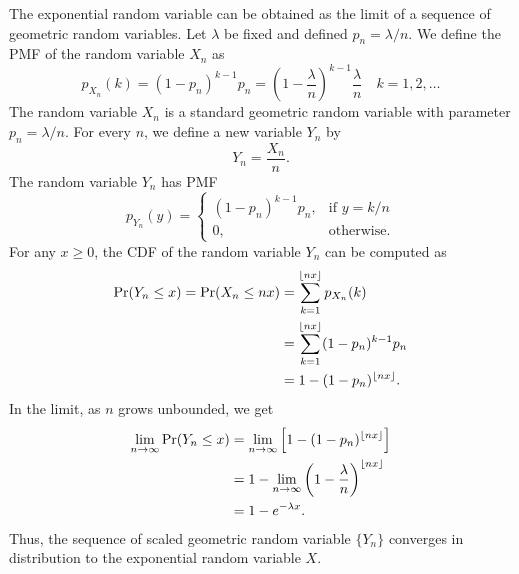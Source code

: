 The exponential random variable can be obtained as the limit of a sequence of geometric random variables.
Let $\lambda$ be fixed and defined $p_n = \lambda/n$.
We define the PMF of the random variable $X_n$ as
\begin{equation*}
p_{X_n} (k) = (1 - p_n)^{k-1} p_n
= \left( 1 - \frac{\lambda}{n} \right)^{k-1} \frac{\lambda}{n}
\quad k = 1, 2, \ldots
\end{equation*}
The random variable $X_n$ is a standard geometric random variable with parameter $p_n = \lambda/n$.
For every $n$, we define a new variable $Y_n$ by
\begin{equation*}
Y_n = \frac{X_n}{n}.
\end{equation*}
The random variable $Y_n$ has PMF
\begin{equation*}
p_{Y_n} (y) = \left\{ \begin{array}{ll}
(1 - p_n)^{k-1} p_n, & \text{if }y = k/n \\
0, & \text{otherwise} .
\end{array} \right.
\end{equation*}
For any $x \geq 0$, the CDF of the random variable $Y_n$ can be computed as
\begin{equation*}
\begin{split}
\Pr (Y_n \leq x)
= \Pr (X_n \leq n x)
&= \sum_{k = 1}^{\lfloor n x \rfloor} p_{X_n} (k) \\
&= \sum_{k = 1}^{\lfloor n x \rfloor} (1 - p_n)^{k-1} p_n \\
&= 1 - (1 - p_n)^{\lfloor n x \rfloor} .
\end{split}
\end{equation*}
In the limit, as $n$ grows unbounded, we get
\begin{equation*}
\begin{split}
\lim_{n \rightarrow \infty} \Pr (Y_n \leq x)
&= \lim_{n \rightarrow \infty} \left[ 1 - (1 - p_n)^{\lfloor n x \rfloor} \right] \\
&= 1 - \lim_{n \rightarrow \infty}
\left( 1 - \frac{\lambda}{n} \right)^{\lfloor n x \rfloor} \\
&= 1 - e^{- \lambda x} .
\end{split}
\end{equation*}
Thus, the sequence of scaled geometric random variable $\{ Y_n \}$ converges in distribution to the exponential random variable $X$.

